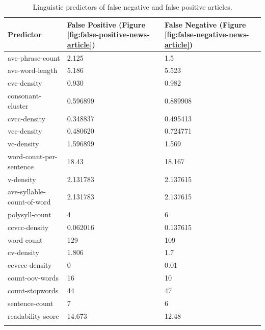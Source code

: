 \begin{table}
    \begin{tabularx}{\textwidth}{|X|X|X|}
        \hline
        Predictor & False Positive (Figure \ref{fig:false-positive-news-article}) & False Negative (Figure \ref{fig:false-negative-news-article}) \\ 
        \hline
        ave-phrase-count & 2.125 & 1.5 \\
        \hline
        ave-word-length & 5.186 & 5.523 \\
        \hline
        cvc-density & 0.930 & 0.982\\ 
        \hline 
        consonant-cluster & 0.596899 & 0.889908 \\
        \hline 
        cvcc-density & 0.348837 & 0.495413 \\
        \hline 
        vcc-density & 0.480620 & 0.724771 \\
        \hline 
        vc-density & 1.596899 & 1.569 \\
        \hline 
        word-count-per-sentence & 18.43 & 18.167\\ 
        \hline 
        v-density & 2.131783 & 2.137615\\ 
        \hline 
        ave-syllable-count-of-word & 2.131783 & 2.137615\\ 
        \hline 
        polysyll-count & 4 & 6 \\ 
        \hline 
        ccvcc-density & 0.062016 & 0.137615 \\ 
        \hline 
        word-count & 129 & 109 \\ 
        \hline 
        cv-density & 1.806 & 1.7\\
        \hline 
        ccvccc-density & 0 & 0.01\\ 
        \hline 
        count-oov-words & 16 & 10 \\ 
        \hline 
        count-stopwords & 44 & 47 \\ 
        \hline 
        sentence-count & 7 & 6 \\ 
        \hline 
        readability-score & 14.673 & 12.48 \\
        \hline
    \caption{Linguistic predictors of false negative and false positive articles.}
    \label{tab::pred_false_class_linguistic}
    \end{tabularx}
\end{table}

